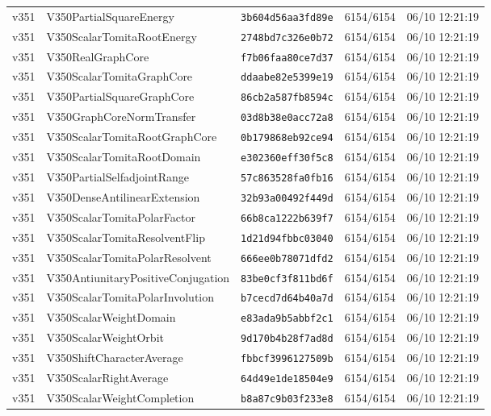 \documentclass[11pt]{article}
\theoremstyle{definition}\newtheorem{deriv}{Derivation}
\begin{document}
{\begin{longtable}{@{}lllll@{}}
v351 & V350PartialSquareEnergy & \texttt{3b604d56aa3fd89e} & 6154/6154 & 06/10 12:21:19 \\
v351 & V350ScalarTomitaRootEnergy & \texttt{2748bd7c326e0b72} & 6154/6154 & 06/10 12:21:19 \\
v351 & V350RealGraphCore & \texttt{f7b06faa80ce7d37} & 6154/6154 & 06/10 12:21:19 \\
v351 & V350ScalarTomitaGraphCore & \texttt{ddaabe82e5399e19} & 6154/6154 & 06/10 12:21:19 \\
v351 & V350PartialSquareGraphCore & \texttt{86cb2a587fb8594c} & 6154/6154 & 06/10 12:21:19 \\
v351 & V350GraphCoreNormTransfer & \texttt{03d8b38e0acc72a8} & 6154/6154 & 06/10 12:21:19 \\
v351 & V350ScalarTomitaRootGraphCore & \texttt{0b179868eb92ce94} & 6154/6154 & 06/10 12:21:19 \\
v351 & V350ScalarTomitaRootDomain & \texttt{e302360eff30f5c8} & 6154/6154 & 06/10 12:21:19 \\
v351 & V350PartialSelfadjointRange & \texttt{57c863528fa0fb16} & 6154/6154 & 06/10 12:21:19 \\
v351 & V350DenseAntilinearExtension & \texttt{32b93a00492f449d} & 6154/6154 & 06/10 12:21:19 \\
v351 & V350ScalarTomitaPolarFactor & \texttt{66b8ca1222b639f7} & 6154/6154 & 06/10 12:21:19 \\
v351 & V350ScalarTomitaResolventFlip & \texttt{1d21d94fbbc03040} & 6154/6154 & 06/10 12:21:19 \\
v351 & V350ScalarTomitaPolarResolvent & \texttt{666ee0b78071dfd2} & 6154/6154 & 06/10 12:21:19 \\
v351 & V350AntiunitaryPositiveConjugation & \texttt{83be0cf3f811bd6f} & 6154/6154 & 06/10 12:21:19 \\
v351 & V350ScalarTomitaPolarInvolution & \texttt{b7cecd7d64b40a7d} & 6154/6154 & 06/10 12:21:19 \\
v351 & V350ScalarWeightDomain & \texttt{e83ada9b5abbf2c1} & 6154/6154 & 06/10 12:21:19 \\
v351 & V350ScalarWeightOrbit & \texttt{9d170b4b28f7ad8d} & 6154/6154 & 06/10 12:21:19 \\
v351 & V350ShiftCharacterAverage & \texttt{fbbcf3996127509b} & 6154/6154 & 06/10 12:21:19 \\
v351 & V350ScalarRightAverage & \texttt{64d49e1de18504e9} & 6154/6154 & 06/10 12:21:19 \\
v351 & V350ScalarWeightCompletion & \texttt{b8a87c9b03f233e8} & 6154/6154 & 06/10 12:21:19 \\

\end{longtable}}
\end{document}
